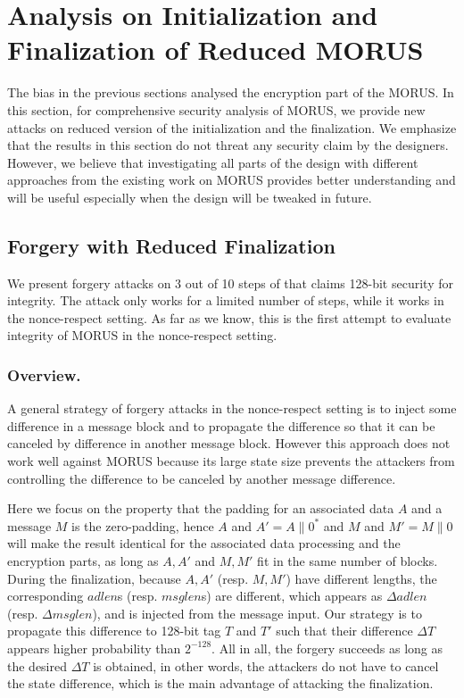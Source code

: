 \section{Analysis on Initialization and Finalization of Reduced MORUS}
\label{sec/IniFin}

The bias in the previous sections analysed the encryption part of the MORUS. In this section, for comprehensive security analysis of MORUS, we provide new attacks on reduced version of the initialization and the finalization. We emphasize that the results in this section do not threat any security claim by the designers. However, we believe that investigating all parts of the design with different approaches from the existing work on MORUS provides better understanding and will be useful especially when the design will be tweaked in future.

\subsection{Forgery with Reduced Finalization}
\label{subsec/Fin}
We present forgery attacks on 3 out of 10 steps of  that claims 128-bit security for integrity. The attack only works for a limited number of steps, while it works in the nonce-respect setting. As far as we know, this is the first attempt to evaluate integrity of MORUS in the nonce-respect setting.

\subsubsection{Overview.}
A general strategy of forgery attacks in the nonce-respect setting is to inject some difference in a message block and to propagate the difference so that it can be canceled by difference in another message block. However this approach does not work well against MORUS because its large state size prevents the attackers from controlling the difference to be canceled by another message difference.

Here we focus on the property that the padding for an associated data $A$ and a message $M$ is the zero-padding, hence $A$ and $A'=A\|0^*$ and $M$ and $M'=M\|0$ will make the result identical for the associated data processing and the encryption parts, as long as $A,A'$ and $M,M'$ fit in the same number of blocks. During the finalization, because $A,A'$ (resp. $M,M'$) have different lengths, the corresponding $adlen$s (resp. $msglen$s) are different, which appears as $\Delta adlen$ (resp. $\Delta msglen$), and is injected from the message input. Our strategy is to propagate this difference to 128-bit tag $T$ and $T'$ such that their difference $\Delta T$ appears higher probability than $2^{-128}$. All in all, the forgery succeeds as long as the desired $\Delta T$ is obtained, in other words, the attackers do not have to cancel the state difference, which is the main advantage of attacking the finalization.

